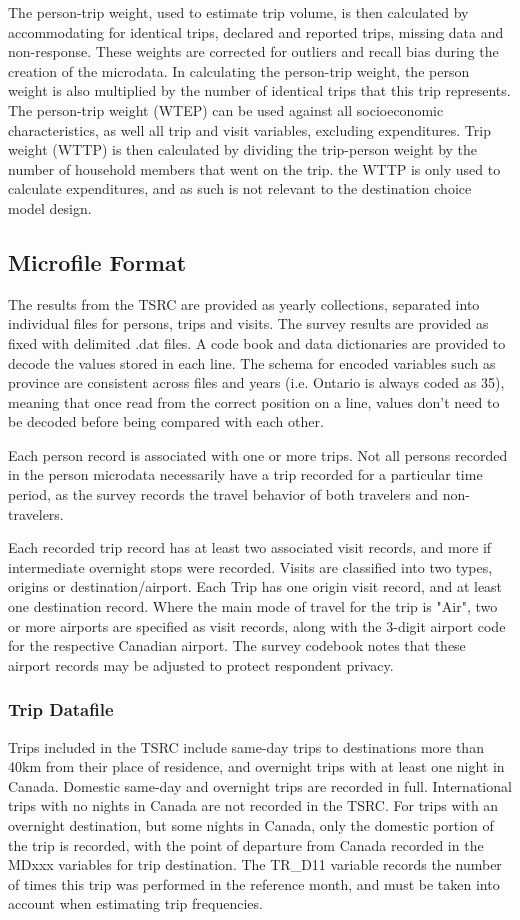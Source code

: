 The person-trip weight, used to estimate trip volume, is then calculated by accommodating for identical trips, declared and reported trips, missing data and non-response. These weights are corrected for outliers and recall bias during the creation of the microdata. In calculating the person-trip weight, the person weight is also multiplied by the number of identical trips that this trip represents. The person-trip weight (WTEP) can be used against all socioeconomic characteristics, as well all trip and visit variables, excluding expenditures. Trip weight (WTTP) is then calculated by dividing the trip-person weight by the number of household members that went on the trip. the WTTP is only used to calculate expenditures, and as such is not relevant to the destination choice model design. 

\subsection{Microfile Format}
The results from the TSRC are provided as yearly collections, separated into individual files for persons, trips and visits. The survey results are provided as fixed with delimited .dat files. A code book and data dictionaries are provided to decode the values stored in each line. The schema for encoded variables such as province are consistent across files and years (i.e. Ontario is always coded as 35), meaning that once read from the correct position on a line, values don't need to be decoded before being compared with each other. 

Each person record is associated with one or more trips. Not all persons recorded in the person microdata necessarily have a trip recorded for a particular time period, as the survey records the travel behavior of both travelers and non-travelers.

Each recorded trip record has at least two associated visit records, and more if intermediate overnight stops were recorded. Visits are classified into two types, origins or destination/airport. Each Trip has one origin visit record, and at least one destination record. Where the main mode of travel for the trip is "Air", two or more airports are specified as visit records, along with the 3-digit airport code for the respective Canadian airport. The survey codebook notes that these airport records may be adjusted to protect respondent privacy.

\subsubsection*{Trip Datafile}
Trips included in the TSRC include same-day trips to destinations more than 40km from their place of residence, and overnight trips with at least one night in Canada. Domestic same-day and overnight trips are recorded in full. International trips with no nights in Canada are not recorded in the TSRC. For trips with an overnight destination, but some nights in Canada, only the domestic portion of the trip is recorded, with the point of departure from Canada recorded in the MDxxx variables for trip destination. The TR\_D11 variable records the number of times this trip was performed in the reference month, and must be taken into account when estimating trip frequencies.

